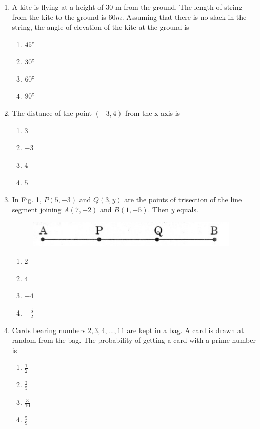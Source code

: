 \documentclass[journal,12pt,twocolumn]{IEEEtran}
\renewcommand\thesection{\arabic{section}}
\begin{document}
\begin{enumerate}[label=\thesection.\arabic*.,ref=\thesection.\theenumi]
\item A kite is flying at a height of 30 m from the ground. The length of string from the kite to the ground is $60 m$. Assuming that there is no slack in the string, the angle of elevation of the kite at the ground is
\begin{enumerate}
    \item $45\degree$\\
    \item $30\degree$\\
    \item $60\degree$\\
    \item $90\degree$\\
 \end{enumerate}
\item The distance of the point $(-3 , 4)$ from the x-axis is
 \begin{enumerate}
    \item $3$\\
    \item $-3$\\
    \item $4$\\
    \item $5$ \\
 \end{enumerate}
\item In Fig. \ref{fig2}, $P(5, -3)$ and $Q(3, y)$ are the points of trisection of the line segment joining $A(7, -2)$ and $B(1, -5)$. Then $y$ equals.\\
\begin{figure}[h!]
    \centering
    \includegraphics[width=0.5\columnwidth,center]{./fig/2.png}
    \caption{}
    \label{fig2}
 \end{figure}
 \begin{enumerate}
  \item $2$\\
  \item $4$ \\
  \item $-4$ \\
  \item $-\frac{5}{2}$
\end{enumerate}
\item Cards bearing numbers $2,3,4, ..., 11$ are kept in a bag. A card is drawn at random from the bag. The probability of getting a card with a prime number is\\
 \begin{enumerate}
     \item $\frac{1}{2}$\\
     \item $\frac{2}{5}$\\
     \item $\frac{3}{10}$\\
     \item $\frac{5}{9}$\\
 \end{enumerate}
\end{enumerate}
\end{document}
